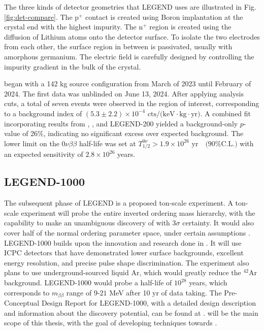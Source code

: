 The three kinds of detector geometries that LEGEND uses are illustrated in Fig. \ref{fig:det-compare}. The p$^+$ contact is created using Boron implantation at the crystal end with the highest impurity. The n$^+$ region is created using the diffusion of Lithium atoms onto the detector surface. To isolate the two electrodes from each other, the surface region in between is passivated, usually with amorphous germanium. The electric field is carefully designed by controlling the impurity gradient in the bulk of the crystal. 


{\Ltwo} began with a 142 kg source configuration from March of 2023 until February of 2024. The first data was unblinded on June 13, 2024. After applying analysis cuts, a total of seven events were observed in the region of interest, corresponding to a background index of $ (5.3 \pm 2.2) \times 10^{-4} \text{ cts/(keV$\cdot$kg$\cdot$yr)}$. A combined fit incorporating results from {\Gerda}, {\MJ}, and LEGEND-200 yielded a background-only $p$-value of 26\%, indicating no significant excess over expected background. The lower limit on the 0$\nu\beta\beta$ half-life was set at $T^{0\nu}_{1/2} > 1.9 \times 10^{26} \text{ yr} \quad \text{(90\% C.L.)}$ with an expected sensitivity of $2.8 \times 10^{26}$ years. \cite{Pertoldi2024}

\subsection{LEGEND-1000}
The subsequent phase of LEGEND is a proposed ton-scale experiment. A ton-scale experiment will probe the entire inverted ordering mass hierarchy, with the capability to make an unambiguous discovery of {\onbb} with $3\sigma$ certainty. It would also cover half of the normal ordering parameter space, under certain assumptions \cite{l1000_pcdr}. LEGEND-1000 builds upon the innovation and research done in {\Ltwo}. It will use ICPC detectors that have demonstrated lower surface backgrounds, excellent energy resolution, and precise pulse shape discrimination. The experiment also plans to use underground-sourced liquid Ar, which would greatly reduce the $^{42}$Ar background. LEGEND-1000 would probe a half-life of $10^{28}$ years, which corresponds to $m_{\beta\beta}$ range of $9$-$21$ MeV after 10 yr of data taking. The Pre-Conceptual Design Report for LEGEND-1000, with a detailed design description and information about the discovery potential, can be found at \cite{l1000_pcdr}. {\Ltwo} will be the main scope of this thesis, with the goal of developing techniques towards {\Lthou}.



